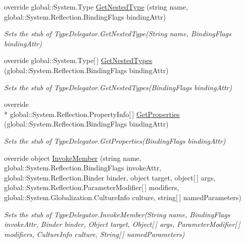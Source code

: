 \begin{DoxyCompactItemize}
override global\-::\-System.\-Type \hyperlink{class_system_1_1_reflection_1_1_fakes_1_1_stub_type_delegator_a8e647036cc0e59a2da0ec934c7b1d26b}{Get\-Nested\-Type} (string name, global\-::\-System.\-Reflection.\-Binding\-Flags binding\-Attr)
\begin{DoxyCompactList}\small\item\em Sets the stub of Type\-Delegator.\-Get\-Nested\-Type(\-String name, Binding\-Flags binding\-Attr)\end{DoxyCompactList}\item 
override global\-::\-System.\-Type\mbox{[}$\,$\mbox{]} \hyperlink{class_system_1_1_reflection_1_1_fakes_1_1_stub_type_delegator_afe8d91d75838914a2877cd581640e4a3}{Get\-Nested\-Types} (global\-::\-System.\-Reflection.\-Binding\-Flags binding\-Attr)
\begin{DoxyCompactList}\small\item\em Sets the stub of Type\-Delegator.\-Get\-Nested\-Types(\-Binding\-Flags binding\-Attr)\end{DoxyCompactList}\item 
override \\*
global\-::\-System.\-Reflection.\-Property\-Info\mbox{[}$\,$\mbox{]} \hyperlink{class_system_1_1_reflection_1_1_fakes_1_1_stub_type_delegator_a4b876d206ea20605dc3a29854ca8939f}{Get\-Properties} (global\-::\-System.\-Reflection.\-Binding\-Flags binding\-Attr)
\begin{DoxyCompactList}\small\item\em Sets the stub of Type\-Delegator.\-Get\-Properties(\-Binding\-Flags binding\-Attr)\end{DoxyCompactList}\item 
override object \hyperlink{class_system_1_1_reflection_1_1_fakes_1_1_stub_type_delegator_ad7c70671cdf113226cdcd47f3cc82480}{Invoke\-Member} (string name, global\-::\-System.\-Reflection.\-Binding\-Flags invoke\-Attr, global\-::\-System.\-Reflection.\-Binder binder, object target, object\mbox{[}$\,$\mbox{]} args, global\-::\-System.\-Reflection.\-Parameter\-Modifier\mbox{[}$\,$\mbox{]} modifiers, global\-::\-System.\-Globalization.\-Culture\-Info culture, string\mbox{[}$\,$\mbox{]} named\-Parameters)
\begin{DoxyCompactList}\small\item\em Sets the stub of Type\-Delegator.\-Invoke\-Member(\-String name, Binding\-Flags invoke\-Attr, Binder binder, Object target, Object\mbox{[}$\,$\mbox{]} args, Parameter\-Modifier\mbox{[}$\,$\mbox{]} modifiers, Culture\-Info culture, String\mbox{[}$\,$\mbox{]} named\-Parameters)\end{DoxyCompactList}\item 

\end{DoxyCompactItemize}
